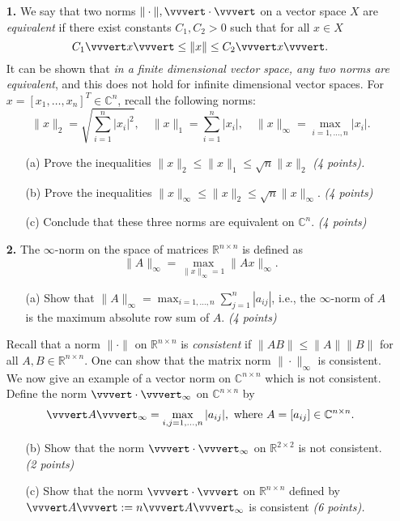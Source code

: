 \documentclass[10pt]{report}
\begin{document}
\begin{enumerate}
\item[\textbf{1.}] 
We say that two norms $\| \cdot \|, \vvvert \cdot \vvvert$ on a vector space $X$ are \textit{equivalent} if there exist constants $C_1, C_2 > 0$ such that for all $x \in X$
\[C_1 \vvvert x \vvvert \leq \|x\| \leq  C_2\vvvert x\vvvert.\]
It can be shown that \textit{in a finite dimensional vector space, any two norms are equivalent}, and this does not hold for infinite dimensional vector spaces. For $x =[x_1, \ldots, x_n]^T \in \mathbb{C}^{n}$, recall the following norms: 
\[
\|x\|_2 =\sqrt{\sum_{i=1}^n |x_i|^2},\quad
\|x\|_1 = \sum_{i=1}^n |x_i|,\quad
\|x\|_{\infty} = \max_{i=1, \ldots,n}|x_i|.
\]
\begin{enumerate}
  \item[(a)] Prove the inequalities $\|x\|_2 \leq \|x\|_1 \leq \sqrt{n}\|x\|_2$ \textit{(4 points).}
  \item[(b)]Prove the inequalities $ \|x\|_\infty \leq \|x\|_2 \leq  \sqrt{n}\|x\|_{\infty}$. \textit{(4 points)}
\item[(c)] Conclude that these three norms are equivalent on $\mathbb{C}^n$. \textit{(4 points)}
\end{enumerate}
\vspace{0.1cm} 

\item[\textbf{2.}] The $\infty$-norm on the space of matrices $\mathbb{R}^{n \times n}$ is defined as
\[ \|A\|_{\infty}= \max_{\|x\|_{\infty}=1} \|Ax\|_{\infty}.\]
\begin{enumerate}  
\item[(a)] Show that $\|A\|_{\infty}= \displaystyle{\max_{i=1, \ldots, n}}\sum_{j=1}^n |a_{ij}|$, i.e., the $\infty$-norm of $A$ is the maximum absolute row sum of $A$. \textit{(4 points)} 
\end{enumerate}

Recall that a norm $\|\cdot\|$ on $\mathbb{R}^{n \times n}$ is \textit{consistent} if $\|AB\| \leq \|A\| \|B\|$ for all $A, B \in \mathbb{R}^{n \times n}$. One can show that the matrix norm $\|\cdot\|_{\infty}$ is consistent. We now give an example of a vector norm on $\mathbb{C}^{n \times n}$ which is not consistent. Define the norm $\vvvert \cdot\vvvert_{\infty}$ on $\mathbb{C}^{n \times n}$ by
\[\vvvert A\vvvert_{\infty} = \max_{i,j=1,\ldots,n}|a_{ij}|, \text{ where } A=[a_{ij}] \in \mathbb{C}^{n \times n}.\]
\begin{enumerate} 
\item[(b)]Show that the norm $\vvvert \cdot \vvvert_\infty$ on $\mathbb{R}^{2 \times 2}$ is not consistent. \textit{(2 points)} 
\item[(c)] Show that the norm $\vvvert \cdot \vvvert$ on $\mathbb{R}^{n \times n}$ defined by $\vvvert A \vvvert  :=n \vvvert A\vvvert _\infty$ is consistent \textit{(6 points).}
\end{enumerate} 



\end{enumerate}
\end{document}
